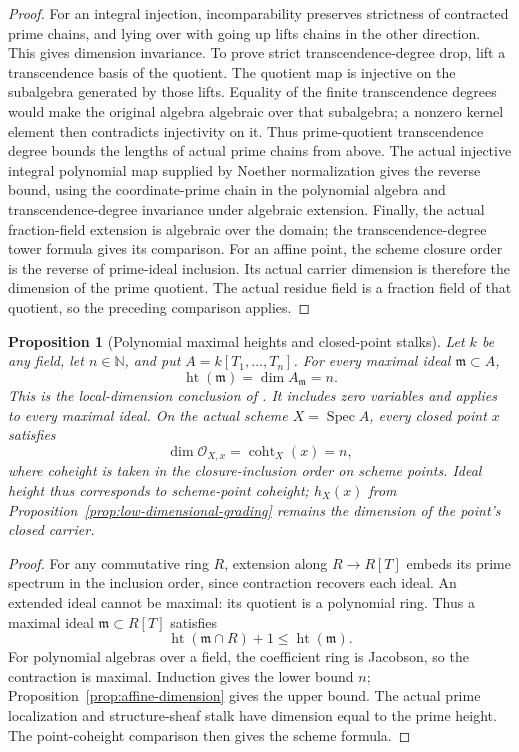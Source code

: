 \documentclass[11pt]{article}
\newtheorem{proposition}[theorem]{Proposition}
\theoremstyle{definition}
\theoremstyle{remark}
\DeclareMathOperator{\Spec}{Spec}
\begin{document}
\begin{proof}
For an integral injection, incomparability preserves strictness of
contracted prime chains, and lying over with going up lifts chains in
the other direction. This gives dimension invariance.
To prove strict transcendence-degree drop, lift a transcendence basis
of the quotient. The quotient map is injective on the subalgebra
generated by those lifts. Equality of the finite transcendence degrees
would make the original algebra algebraic over that subalgebra; a
nonzero kernel element then contradicts injectivity on it.
Thus prime-quotient transcendence degree bounds the lengths of actual
prime chains from above.
The actual injective integral polynomial map supplied by Noether
normalization \cite{StacksNoetherNormalization} gives the reverse
bound, using the coordinate-prime chain in the polynomial algebra and
transcendence-degree invariance under algebraic extension. Finally,
the actual fraction-field extension is algebraic over the domain;
the transcendence-degree tower formula gives its comparison.
For an affine point, the scheme closure order is the reverse of
prime-ideal inclusion. Its actual carrier dimension is therefore the
dimension of the prime quotient. The actual residue field is a
fraction field of that quotient, so the preceding comparison applies.
\end{proof}

\begin{proposition}[Polynomial maximal heights and closed-point stalks]
\label{prop:polynomial-maximal-height}
Let \(k\) be any field, let \(n\in\mathbb N\), and put
\(A=k[T_1,\ldots,T_n]\).
For every maximal ideal \(\mathfrak m\subset A\),
\[
  \operatorname{ht}(\mathfrak m)=\dim A_{\mathfrak m}=n.
\]
This is the local-dimension conclusion of
\cite{StacksPolynomialDimension}. It includes zero variables and
applies to every maximal ideal.
On the actual scheme \(X=\Spec A\), every closed point \(x\) satisfies
\[
  \dim\mathcal O_{X,x}=\operatorname{coht}_X(x)=n,
\]
where coheight is taken in the closure-inclusion order on scheme
points. Ideal height thus corresponds to scheme-point coheight;
\(h_X(x)\) from Proposition~\ref{prop:low-dimensional-grading}
remains the dimension of the point's closed carrier.
\end{proposition}

\begin{proof}
For any commutative ring \(R\), extension along \(R\to R[T]\)
embeds its prime spectrum in the inclusion order, since contraction
recovers each ideal. An extended ideal cannot be maximal: its quotient
is a polynomial ring. Thus a maximal ideal \(\mathfrak m\subset R[T]\)
satisfies
\[
  \operatorname{ht}(\mathfrak m\cap R)+1
    \leq\operatorname{ht}(\mathfrak m).
\]
For polynomial algebras over a field, the coefficient ring is
Jacobson, so the contraction is maximal. Induction gives the lower
bound \(n\); Proposition~\ref{prop:affine-dimension} gives the upper
bound. The actual prime localization and structure-sheaf stalk have
dimension equal to the prime height. The point-coheight comparison
then gives the scheme formula.
\end{proof}
\end{document}
